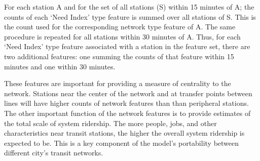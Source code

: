 \documentclass[11pt]{article}
\begin{document}
For each station A and for the set of all stations (S) within 15 minutes of A; the counts of each `Need Index' type feature is summed over all stations of S. This is the count used for the corresponding network type feature of A. The same procedure is repeated for all stations within 30 minutes of A. Thus, for each `Need Index' type feature associated with a station in the feature set, there are two additional features: one summing the counts of that feature within 15 minutes and one within 30 minutes. 

These features are important for providing a measure of centrality to the network. Stations near the center of the network and at transfer points between lines will have higher counts of network features than than peripheral stations. The other important function of the network features is to provide estimates of the total scale of system ridership. The more people, jobs, and other characteristics near transit stations, the higher the overall system ridership is expected to be. This is a key component of the model's portability between different city's transit networks. 
\end{document}
